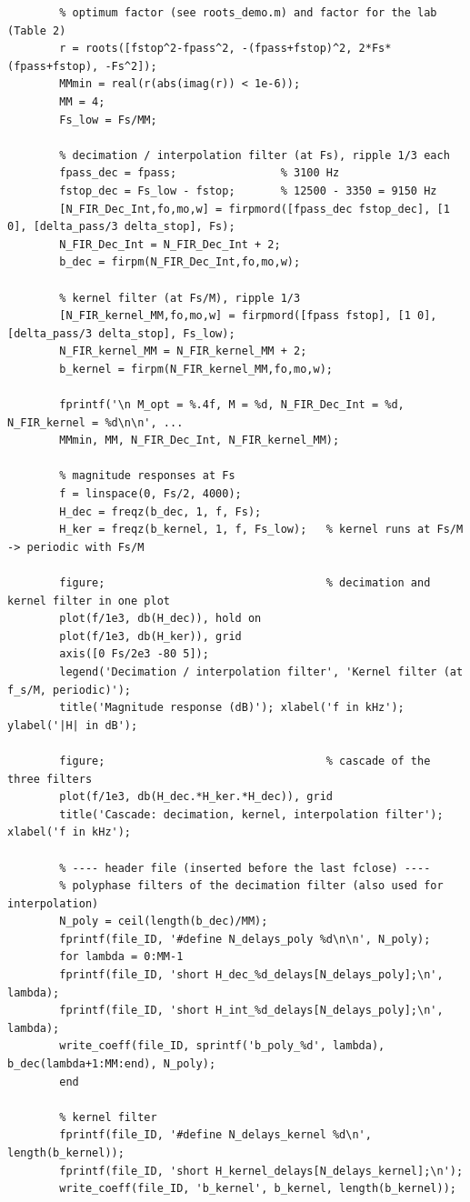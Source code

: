 \documentclass[a4paper,11pt]{article}
\begin{document}
	\begin{lstlisting}[style=matlab, caption={Design of the decimation/interpolation and kernel filter, magnitude plots and header export, added to \texttt{dec\_kernel\_int\_WS20\_EMIL.m}, Section 3.2.2}, label={lst:m322}]
		% ---- 3.2 multirate filter design ----
		% optimum factor (see roots_demo.m) and factor for the lab (Table 2)
		r = roots([fstop^2-fpass^2, -(fpass+fstop)^2, 2*Fs*(fpass+fstop), -Fs^2]);
		MMmin = real(r(abs(imag(r)) < 1e-6));
		MM = 4;
		Fs_low = Fs/MM;
		
		% decimation / interpolation filter (at Fs), ripple 1/3 each
		fpass_dec = fpass;                % 3100 Hz
		fstop_dec = Fs_low - fstop;       % 12500 - 3350 = 9150 Hz
		[N_FIR_Dec_Int,fo,mo,w] = firpmord([fpass_dec fstop_dec], [1 0], [delta_pass/3 delta_stop], Fs);
		N_FIR_Dec_Int = N_FIR_Dec_Int + 2;
		b_dec = firpm(N_FIR_Dec_Int,fo,mo,w);
		
		% kernel filter (at Fs/M), ripple 1/3
		[N_FIR_kernel_MM,fo,mo,w] = firpmord([fpass fstop], [1 0], [delta_pass/3 delta_stop], Fs_low);
		N_FIR_kernel_MM = N_FIR_kernel_MM + 2;
		b_kernel = firpm(N_FIR_kernel_MM,fo,mo,w);
		
		fprintf('\n M_opt = %.4f, M = %d, N_FIR_Dec_Int = %d, N_FIR_kernel = %d\n\n', ...
		MMmin, MM, N_FIR_Dec_Int, N_FIR_kernel_MM);
		
		% magnitude responses at Fs
		f = linspace(0, Fs/2, 4000);
		H_dec = freqz(b_dec, 1, f, Fs);
		H_ker = freqz(b_kernel, 1, f, Fs_low);   % kernel runs at Fs/M -> periodic with Fs/M
		
		figure;                                  % decimation and kernel filter in one plot
		plot(f/1e3, db(H_dec)), hold on
		plot(f/1e3, db(H_ker)), grid
		axis([0 Fs/2e3 -80 5]);
		legend('Decimation / interpolation filter', 'Kernel filter (at f_s/M, periodic)');
		title('Magnitude response (dB)'); xlabel('f in kHz'); ylabel('|H| in dB');
		
		figure;                                  % cascade of the three filters
		plot(f/1e3, db(H_dec.*H_ker.*H_dec)), grid
		title('Cascade: decimation, kernel, interpolation filter'); xlabel('f in kHz');
		
		% ---- header file (inserted before the last fclose) ----
		% polyphase filters of the decimation filter (also used for interpolation)
		N_poly = ceil(length(b_dec)/MM);
		fprintf(file_ID, '#define N_delays_poly %d\n\n', N_poly);
		for lambda = 0:MM-1
		fprintf(file_ID, 'short H_dec_%d_delays[N_delays_poly];\n', lambda);
		fprintf(file_ID, 'short H_int_%d_delays[N_delays_poly];\n', lambda);
		write_coeff(file_ID, sprintf('b_poly_%d', lambda), b_dec(lambda+1:MM:end), N_poly);
		end
		
		% kernel filter
		fprintf(file_ID, '#define N_delays_kernel %d\n', length(b_kernel));
		fprintf(file_ID, 'short H_kernel_delays[N_delays_kernel];\n');
		write_coeff(file_ID, 'b_kernel', b_kernel, length(b_kernel));
	\end{lstlisting}
	
\end{document}
